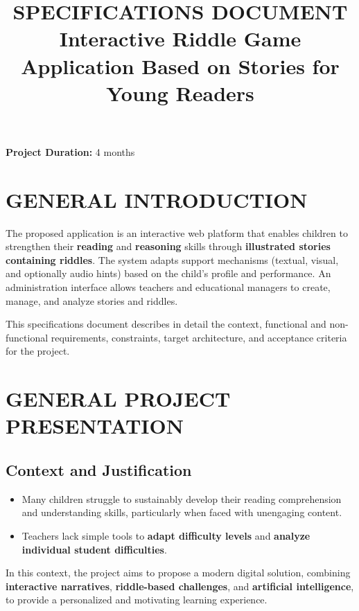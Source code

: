 \documentclass[12pt,a4paper]{article}
\title{\textbf{SPECIFICATIONS DOCUMENT} \\[0.5cm] \large Interactive Riddle Game Application Based on Stories for Young Readers}
\author{}
\begin{document}
\maketitle

\textbf{Project Duration:} 4 months

\newpage

\tableofcontents

\newpage


\newpage

\section*{GENERAL INTRODUCTION}

The proposed application is an interactive web platform that enables children to strengthen their \textbf{reading} and \textbf{reasoning} skills through \textbf{illustrated stories containing riddles}. The system adapts support mechanisms (textual, visual, and optionally audio hints) based on the child's profile and performance. An administration interface allows teachers and educational managers to create, manage, and analyze stories and riddles.

This specifications document describes in detail the context, functional and non-functional requirements, constraints, target architecture, and acceptance criteria for the project.

\newpage

\section{GENERAL PROJECT PRESENTATION}

\subsection{Context and Justification}

\begin{itemize}
    \item Many children struggle to sustainably develop their reading comprehension and understanding skills, particularly when faced with unengaging content.
    \item Teachers lack simple tools to \textbf{adapt difficulty levels} and \textbf{analyze individual student difficulties}.
\end{itemize}

In this context, the project aims to propose a modern digital solution, combining \textbf{interactive narratives}, \textbf{riddle-based challenges}, and \textbf{artificial intelligence}, to provide a personalized and motivating learning experience.
\end{document}
